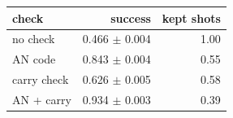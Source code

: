 \begin{tabular}{lrr}
\toprule
check & success & kept shots \\
\midrule
no check & 0.466 $\pm$ 0.004 & 1.00 \\
AN code & 0.843 $\pm$ 0.004 & 0.55 \\
carry check & 0.626 $\pm$ 0.005 & 0.58 \\
AN + carry & 0.934 $\pm$ 0.003 & 0.39 \\
\bottomrule
\end{tabular}
